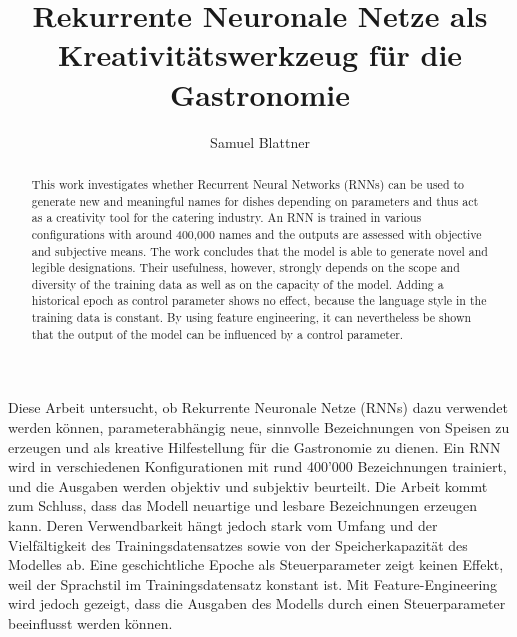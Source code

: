 \documentclass{ffhsthesis}
\begin{document}
    \title{Rekurrente Neuronale Netze als Kreativitätswerkzeug für die Gastronomie}
    \author{Samuel Blattner}


    \maketitle

    \begin{zusammenfassung}
        Diese Arbeit untersucht, ob Rekurrente Neuronale Netze (RNNs) dazu verwendet werden können,
        parameterabhängig neue, sinnvolle Bezeichnungen von Speisen zu erzeugen und als kreative Hilfestellung für die Gastronomie zu dienen.
        Ein RNN wird in verschiedenen Konfigurationen mit rund 400'000 Bezeichnungen trainiert, und die Ausgaben werden objektiv und subjektiv beurteilt.
        Die Arbeit kommt zum Schluss, dass das Modell neuartige und lesbare Bezeichnungen erzeugen kann.
        Deren Verwendbarkeit hängt jedoch stark vom Umfang und der Vielfältigkeit des Trainingsdatensatzes sowie von der Speicherkapazität des Modelles ab.
        Eine geschichtliche Epoche als Steuerparameter zeigt keinen Effekt, weil der Sprachstil im Trainingsdatensatz konstant ist.
        Mit Feature-Engineering wird jedoch gezeigt, dass die Ausgaben des Modells durch einen Steuerparameter beeinflusst werden können.

    \end{zusammenfassung}

    \begin{abstract}
        This work investigates whether Recurrent Neural Networks (RNNs) can be used to generate new and meaningful names for
        dishes depending on parameters and thus act as a creativity tool for the catering industry.
        An RNN is trained in various configurations with around 400,000 names and the outputs are assessed with objective and subjective means.
        The work concludes that the model is able to generate novel and legible designations.
        Their usefulness, however, strongly depends on the scope and diversity of the training data as well as on the capacity of the model.
        Adding a historical epoch as control parameter shows no effect, because the language style in the training data is constant.
        By using feature engineering, it can nevertheless be shown that the output of the model can be influenced by a control parameter.

    \end{abstract}
\end{document}

